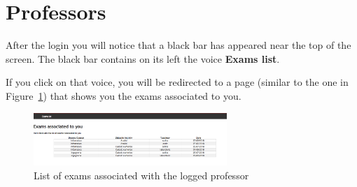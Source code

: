 \section{Professors}
After the login you will notice that a black bar has appeared near the top of the screen.
The black bar contains on its left the voice \textbf{Exams list}.

If you click on that voice, you will be redirected to a page (similar to the one in Figure~\ref{fig:professorExamsList}) that shows you the exams associated to you.

\begin{figure}[!h]
\centering
\includegraphics[width=0.65\textwidth]{img/professorExamsList.png}
\caption{List of exams associated with the logged professor}
\label{fig:professorExamsList}
\end{figure}
